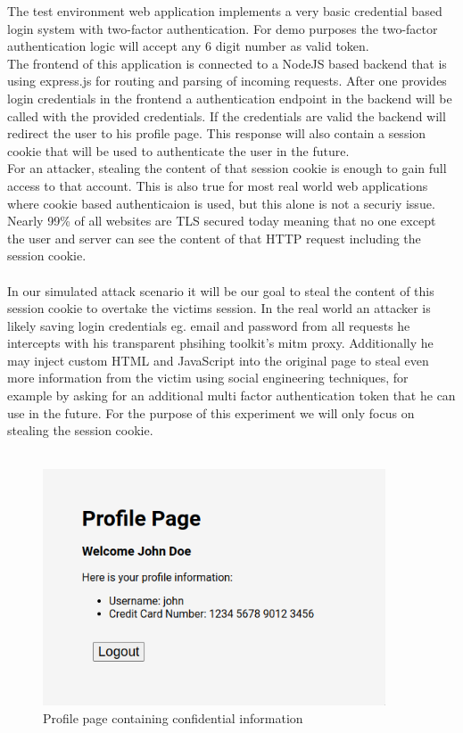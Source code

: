 \documentclass[12pt]{report}
\begin{document}
The test environment web application implements a very basic credential based login system with two-factor
authentication. For demo purposes the two-factor authentication logic will accept any 6 digit number as
valid token.\\The frontend of this application is connected to a NodeJS based backend that is using express.js
for routing and parsing of incoming requests. After one provides login credentials in the frontend a authentication
endpoint in the backend will be called with the provided credentials. If the credentials are valid the backend
will redirect the user to his profile page. This response will also contain a session cookie that will be used
to authenticate the user in the future.\\For an attacker, stealing the content of that session cookie is enough to
gain full access to that account. This is also true for most real world web applications where cookie based authenticaion
is used, but this alone is not a securiy issue. Nearly 99\% of all websites are TLS secured today \cite{tlsPercentage} meaning
that no one except the user and server can see the content of that HTTP request including the session cookie.\\ \\

In our simulated attack scenario it will be our goal to steal the content of this session cookie to overtake the victims
session. In the real world an attacker is likely saving login credentials eg. email and password from all requests he intercepts
with his transparent phsihing toolkit's mitm proxy. Additionally he may inject custom HTML and JavaScript into the original page
to steal even more information from the victim using social engineering techniques, for example by asking for an additional
multi factor authentication token that he can use in the future. For the purpose of this experiment we will only focus on
stealing the session cookie.\\ \\

\begin{figure}[!htb]
  \centering
  \includegraphics[height=7cm]{./images/profile_page.png}
  \caption{Profile page containing confidential information}
\end{figure}
\end{document}
